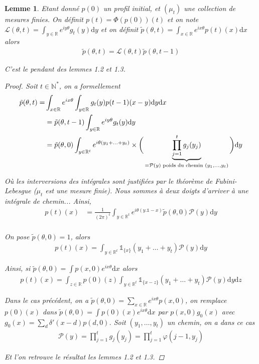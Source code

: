 \documentclass{article}
\newtheorem{lemma}[theorem]{Lemme}
\theoremstyle{definition}
\begin{document}
\begin{lemma}
	Etant donné $p(0)$ un profil initial, et $(\mu_t)$ une collection de mesures finies. On définit $p(t) = \Phi(p(0))(t)$ et on note $\mathcal{L}(\theta,t) = \int_{y\in\mathbb{R}}e^{iy \theta}g_t(y)\mathrm{d}y$ et on définit $\tilde{p}(\theta, t) = \int_{x\in\mathbb{R}} e^{i x \theta} p(t)(x)\mathrm{d}x$ alors 
	\begin{align*}
		\tilde{p}(\theta, t) = \mathcal{L}(\theta, t) \tilde{p}(\theta, t-1)
	\end{align*}

	C'est le pendant des lemmes 1.2 et 1.3.
	\begin{proof}
		Soit $t\in \mathbb{N}^*$, on a formellement
		\begin{align*}
			\tilde{p}(\theta, t) = &\int_{x\in\mathbb{R}}e^{ix\theta}\int_{y\in\mathbb{R}} g_t(y)p(t-1)(x-y)\mathrm{d}y\mathrm{d}x\\
			&= \tilde{p}(\theta, t-1)\int_{y\in\mathbb{R}}e^{iy\theta}g_t(y)\mathrm{d}y\\
			&= \tilde{p}(\theta, 0) \int_{y\in\mathbb{R}^t}e^{i\theta(y_1+\ldots+y_t)}\times\bigg(\underbrace{\prod_{j=1}^t g_j(y_j)}_{=\mathcal{P}(y) \textup{ poids du chemin } (y_1,\ldots, y_t)}\bigg)\mathrm{d}y
		\end{align*}

		Où les interversions des intégrales sont justifiées par le théorème de Fubini-Lebesgue ($\mu_t$ est une mesure finie). Nous sommes à deux doigts d'arriver à une intégrale de chemin... Ainsi,  
		\begin{align*}
			p(t)(x) &= \frac{1}{(2\pi)^t}\int_{y\in\mathbb{R}^t}e^{i\theta (y.\mathds{1}-x)}\tilde{p}(\theta, 0)\mathcal{P}(y) \mathrm{d}y\\
		\end{align*}

		On pose $\tilde{p}(\theta, 0)=1$, alors
		\begin{align*}
		p(t)(x) = \int_{y\in\mathbb{R}^t}\mathds{1}_{\{x\}}(y_1+\ldots+y_t) \mathcal{P}(y)\mathrm{d}y
		\end{align*}

		Ainsi, si $\tilde{p}(\theta, 0) = \int p(x,0)e^{i x \theta}\mathrm{d}x$ alors 
		\begin{align*}
			p(t)(x) = \int_{z\in\mathbb{R}} p(0)(z)\int_{y\in\mathbb{R}^t}\mathds{1}_{\{x-z\}}(y_1+\ldots+y_t)\mathcal{P}(y)\mathrm{d}y\mathrm{d}z
		\end{align*}

		Dans le cas précédent, on a $\tilde{p}(\theta, 0) = \sum_{x\in\mathbb{R}}e^{ix \theta}p(x,0)$, on remplace $p(0)(x)$ dans $\tilde{p}(\theta, 0) = \int p(0)(x)e^{ix\theta}\mathrm{d}x$ par $p(x,0)g_0(x)$ avec $g_0(x) = \sum_{d}\delta'(x-d)p(d,0)$. Soit $(y_1,\ldots,y_t)$ un chemin, on a dans ce cas
		\begin{align*}
			\mathcal{P}(y) = \prod_{j=1}^t g_j(y_j) = \prod_{j=1}^t \varphi(j-1,y_j)
		\end{align*}

		Et l'on retrouve le résultat les lemmes 1.2 et 1.3.
	\end{proof}
\end{lemma}
\end{document}

